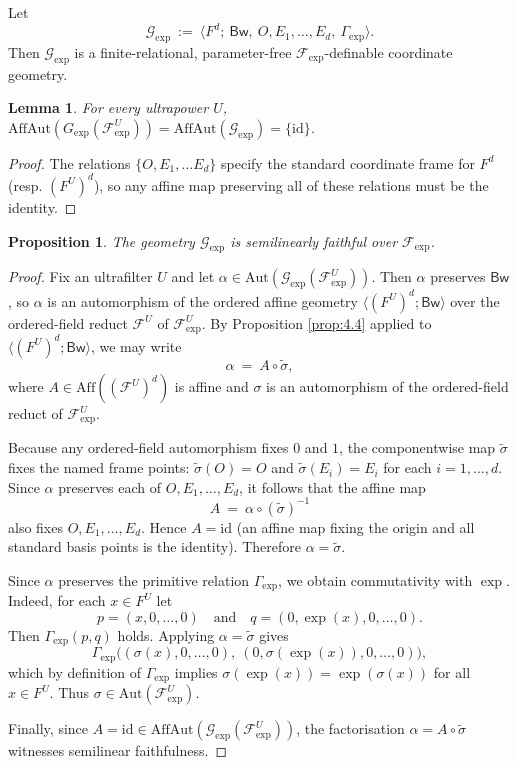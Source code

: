 \documentclass[11pt,a4paper]{article}
\newcommand{\G}{\mathcal{G}}
\newcommand{\F}{\mathcal{F}}
\newtheorem{lemma}[theorem]{Lemma}
\newtheorem{proposition}[theorem]{Proposition}
\theoremstyle{definition}
\begin{document}
Let \[
\G_{\exp}\ :=\ \langle F^d;\ \mathsf{Bw},\ O,E_1,\dots,E_d,\ \Gamma_{\exp}\rangle .
\] Then $\G_{\exp}$ is a finite-relational, parameter-free
$\F_{\exp}$-definable coordinate geometry.

\begin{lemma}
	\label{lem:8.4}
	\label{lem:8.5}
For every ultrapower $U$,
$\mathrm{AffAut}(G_{\exp}(\F_{\exp}^U)) =
 \mathrm{AffAut}(\G_{\exp}) =
 \{\mathrm{id}\}$.
\end{lemma}
\begin{proof}
	The relations $\{ O, E_1, \dots E_d \}$ specify the standard coordinate frame for $F^d$ (resp.  $(F^U)^d$), so any
	affine map preserving all of these relations must be the identity.
\end{proof}




\begin{proposition}
	\label{prop:8.6}
The geometry $\G_{\exp}$ is semilinearly
faithful over $\F_{\exp}$.
\end{proposition}

\begin{proof}
Fix an ultrafilter $U$ and let
$\alpha\in \mathrm{Aut}(\G_{\exp}(\F_{\exp}^U))$. Then
$\alpha$ preserves $\mathsf{Bw}$, so $\alpha$ is an automorphism
of the ordered affine geometry $\langle (F^U)^d;\mathsf{Bw}\rangle$
over the ordered-field reduct $\F^U$ of $\F_{\exp}^U$. By
Proposition \ref{prop:4.4} applied to $\langle (F^U)^d;\mathsf{Bw}\rangle$, we
may write \[
\alpha \ =\ A\circ \widetilde\sigma,
\] where $A\in \mathrm{Aff}((\F^U)^d)$ is affine and $\sigma$ is an
automorphism of the ordered-field reduct of $\F_{\exp}^U$.

Because any ordered-field automorphism fixes $0$ and $1$, the
componentwise map $\widetilde\sigma$ fixes the named frame points:
$\widetilde\sigma(O)=O$ and $\widetilde\sigma(E_i)=E_i$ for each
$i=1,\dots,d$. Since $\alpha$ preserves each of $O,E_1,\dots,E_d$,
it follows that the affine map \[
A \ =\ \alpha\circ (\widetilde\sigma)^{-1}
\] also fixes $O,E_1,\dots,E_d$. Hence $A=\mathrm{id}$ (an affine
map fixing the origin and all standard basis points is the identity).
Therefore $\alpha=\widetilde\sigma$.

Since $\alpha$ preserves the primitive relation $\Gamma_{\exp}$, we
obtain commutativity with $\exp$. Indeed, for each $x\in F^U$ let \[
p=(x,0,\dots,0)\quad\text{and}\quad q=(0,\exp(x),0,\dots,0).
\] Then $\Gamma_{\exp}(p,q)$ holds. Applying
$\alpha=\widetilde\sigma$ gives \[
\Gamma_{\exp}\big((\sigma(x),0,\dots,0),\ (0,\sigma(\exp(x)),0,\dots,0)\big),
\] which by definition of $\Gamma_{\exp}$ implies
$\sigma(\exp(x))=\exp(\sigma(x))$ for all $x\in F^U$. Thus
$\sigma\in \mathrm{Aut}(\F_{\exp}^U)$.

Finally, since
$A=\mathrm{id}\in \mathrm{AffAut}(\G_{\exp}(\F_{\exp}^U))$, the
factorisation $\alpha=A\circ \widetilde\sigma$ witnesses semilinear
faithfulness.
\end{proof}
\end{document}
